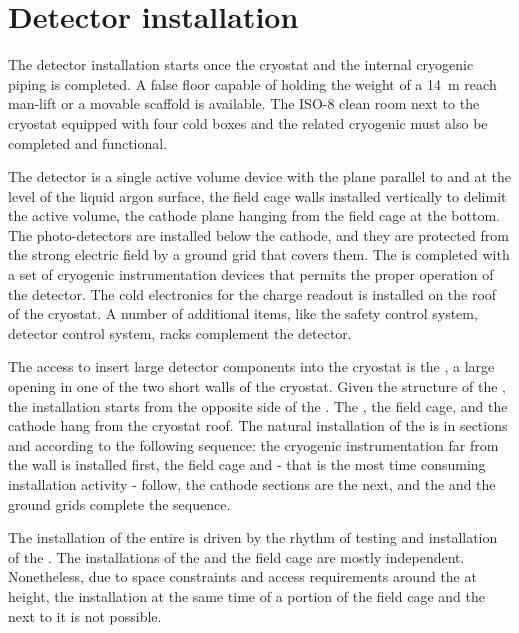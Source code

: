 \section{Detector installation}
\label{ch:dp-tc-installation}

The detector installation starts once the cryostat and the internal cryogenic piping is completed.
A false floor capable of holding the weight of a 14~m reach man-lift or a movable scaffold is available.
The ISO-8 clean room next to the cryostat equipped with four cold boxes and the related cryogenic must also be completed and functional.

The  detector is a single active volume device with the  plane parallel to and at the level of the liquid argon surface, the field cage walls installed vertically to delimit the active volume, the cathode plane hanging from the field cage at the bottom.
The photo-detectors are installed below the cathode, and they are protected from the strong electric field by a ground grid that covers them.
The  is completed with a set of cryogenic instrumentation devices that permits the proper operation of the detector.
The cold electronics for the charge readout is installed on the roof of the cryostat.
A number of additional items, like the safety control system, detector control system,  racks complement the detector.

The access to insert large detector components into the cryostat is the , a large opening in one of the two short walls of the cryostat.
Given the structure of the , the installation starts from the opposite side of the .
The , the field cage, and the cathode hang from the cryostat roof.
The natural installation of the  is in sections and according to the following sequence: the cryogenic instrumentation far from the  wall is installed first,
the field cage and  - that is the most time consuming installation activity - follow, the cathode sections are the next, and the  and the ground grids complete the sequence.

The installation of the entire  is driven by the rhythm of testing and installation of the .
The installations of the  and the field cage are mostly independent.
Nonetheless, due to space constraints and access requirements around the  at height, the installation at the same time of a portion of the field cage and the  next to it is not possible.

